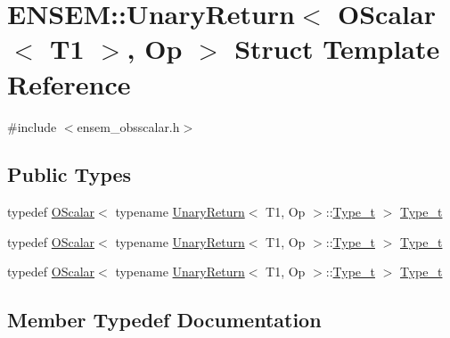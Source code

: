 \hypertarget{structENSEM_1_1UnaryReturn_3_01OScalar_3_01T1_01_4_00_01Op_01_4}{}\section{E\+N\+S\+EM\+:\+:Unary\+Return$<$ O\+Scalar$<$ T1 $>$, Op $>$ Struct Template Reference}
\label{structENSEM_1_1UnaryReturn_3_01OScalar_3_01T1_01_4_00_01Op_01_4}


{\ttfamily \#include $<$ensem\+\_\+obsscalar.\+h$>$}

\subsection*{Public Types}
\begin{DoxyCompactItemize}
\item 
typedef \mbox{\hyperlink{classENSEM_1_1OScalar}{O\+Scalar}}$<$ typename \mbox{\hyperlink{structENSEM_1_1UnaryReturn}{Unary\+Return}}$<$ T1, Op $>$\+::\mbox{\hyperlink{structENSEM_1_1UnaryReturn_3_01OScalar_3_01T1_01_4_00_01Op_01_4_a726cb7ab3c097ee6c39cffe7663a39b1}{Type\+\_\+t}} $>$ \mbox{\hyperlink{structENSEM_1_1UnaryReturn_3_01OScalar_3_01T1_01_4_00_01Op_01_4_a726cb7ab3c097ee6c39cffe7663a39b1}{Type\+\_\+t}}
\item 
typedef \mbox{\hyperlink{classENSEM_1_1OScalar}{O\+Scalar}}$<$ typename \mbox{\hyperlink{structENSEM_1_1UnaryReturn}{Unary\+Return}}$<$ T1, Op $>$\+::\mbox{\hyperlink{structENSEM_1_1UnaryReturn_3_01OScalar_3_01T1_01_4_00_01Op_01_4_a726cb7ab3c097ee6c39cffe7663a39b1}{Type\+\_\+t}} $>$ \mbox{\hyperlink{structENSEM_1_1UnaryReturn_3_01OScalar_3_01T1_01_4_00_01Op_01_4_a726cb7ab3c097ee6c39cffe7663a39b1}{Type\+\_\+t}}
\item 
typedef \mbox{\hyperlink{classENSEM_1_1OScalar}{O\+Scalar}}$<$ typename \mbox{\hyperlink{structENSEM_1_1UnaryReturn}{Unary\+Return}}$<$ T1, Op $>$\+::\mbox{\hyperlink{structENSEM_1_1UnaryReturn_3_01OScalar_3_01T1_01_4_00_01Op_01_4_a726cb7ab3c097ee6c39cffe7663a39b1}{Type\+\_\+t}} $>$ \mbox{\hyperlink{structENSEM_1_1UnaryReturn_3_01OScalar_3_01T1_01_4_00_01Op_01_4_a726cb7ab3c097ee6c39cffe7663a39b1}{Type\+\_\+t}}
\end{DoxyCompactItemize}


\subsection{Member Typedef Documentation}
\mbox{\label{structENSEM_1_1UnaryReturn_3_01OScalar_3_01T1_01_4_00_01Op_01_4_a726cb7ab3c097ee6c39cffe7663a39b1}} 
